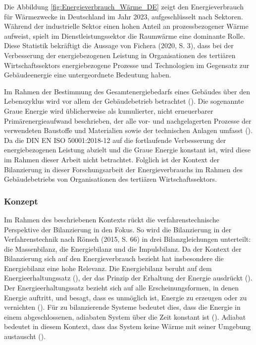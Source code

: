 Die Abbildung \ref{fig:Energieverbrauch_Wärme_DE} zeigt den Energieverbrauch für Wärmezwecke in Deutschland im Jahr 2023, aufgeschlüsselt nach Sektoren. 
Während der industrielle Sektor einen hohen Anteil an prozessbezogener Wärme aufweist, 
spielt im Dienstleistungssektor die Raumwärme eine dominante Rolle.
Diese Statistik bekräftigt die Aussage von Fichera (2020, S. 3), dass bei der Verbesserung der energiebezogenen Leistung in Organisationen des tertiären 
Wirtschaftssektors energiebezogene Prozesse und Technologien im Gegensatz zur Gebäudeenergie eine untergeordnete Bedeutung haben.

Im Rahmen der Bestimmung des Gesamtenergiebedarfs eines Gebäudes über den Lebenszyklus wird vor allem der Gebäudebetrieb betrachtet (\cite[S. 133]{Musall.2015}).
Die sogenannte Graue Energie wird üblicherweise als kumulierter, nicht erneuerbarer Primärenergieaufwand beschrieben, der alle vor- und nachgelagerten Prozesse 
der verwendeten Baustoffe und Materialien sowie der technischen Anlagen umfasst (\cite[S. 133]{Musall.2015}). Da die DIN EN ISO 50001:2018-12 auf die fortlaufende 
Verbesserung der energiebezogenen Leistung abzielt und die Graue Energie konstant ist, wird diese im Rahmen dieser Arbeit nicht betrachtet.
Folglich ist der Kontext der Bilanzierung in dieser Forschungsarbeit der Energieverbrauchs im Rahmen des Gebäudebetriebs von Organisationen 
des tertiären Wirtschaftssektors.


\subsubsection{Konzept}
Im Rahmen des beschriebenen Kontexts rückt die verfahrenstechnische Perspektive der Bilanzierung in den Fokus. 
So wird die Bilanzierung in der Verfahrenstechnik nach Rönsch (2015, S. 66) in drei Bilanzgleichungen unterteilt: die Massenbilanz, 
die Energiebilanz und die Impulsbilanz.
Da der Kontext der Bilanzierung sich auf den Energieverbrauch bezieht hat insbesondere die Energiebilanz eine hohe Relevanz.
Die Energiebilanz beruht auf dem Energieerhaltungssatz (\cite[S. 66]{Rönsch.2015}), der das Prinzip der Erhaltung der Energie ausdrückt 
(\cite[S. 57]{Baehr.1966}). Der Energieerhaltungssatz bezieht sich auf alle Erscheinungsformen, in denen Energie auftritt, und besagt, dass es 
unmöglich ist, Energie zu erzeugen oder zu vernichten (\cite[S. 57]{Baehr.1966}).
Für zu bilanzierende Systeme bedeutet dies, dass die Energie in einem abgeschlossenen, adiabaten System über die Zeit konstant ist 
(\cite[S. 66]{Rönsch.2015}). Adiabat bedeutet in diesem Kontext, dass das System keine Wärme mit seiner Umgebung austauscht (\cite[S. 66]{Rönsch.2015}).

